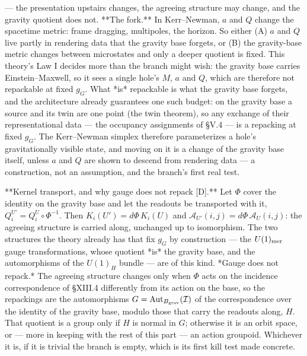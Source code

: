 — the presentation upstairs changes, the agreeing structure may change, and the gravity quotient does not. **The fork.** In Kerr–Newman, $a$ and $Q$ change the spacetime metric: frame dragging, multipoles, the horizon. So either (A) $a$ and $Q$ live partly in rendering data that the gravity base forgets, or (B) the gravity-base metric changes between microstates and only a deeper quotient is fixed. This theory's Law I decides more than the branch might wish: the gravity base carries Einstein–Maxwell, so it sees a single hole's $M$, $a$ and $Q$, which are therefore not repackable at fixed $g_G$. What *is* repackable is what the gravity base forgets, and the architecture already guarantees one such budget: on the gravity base a source and its twin are one point (the twin theorem), so any exchange of their representational data — the occupancy assignments of §V.4 — is a repacking at fixed $g_G$. The Kerr–Newman simplex therefore parameterizes a hole's gravitationally visible state, and moving on it is a change of the gravity base itself, unless $a$ and $Q$ are shown to descend from rendering data — a construction, not an assumption, and the branch's first real test.

**Kernel transport, and why gauge does not repack [D].** Let $\Phi$ cover the identity on the gravity base and let the readouts be transported with it, $Q_i^{U'} = Q_i^U\circ\Phi^{-1}$. Then $K_i(U') = d\Phi\,K_i(U)$ and $\mathcal A_{U'}(i,j) = d\Phi\,\mathcal A_U(i,j)$: the agreeing structure is carried along, unchanged up to isomorphism. The two structures the theory already has that fix $g_G$ by construction — the $U(1)_{\rm mer}$ gauge transformations, whose quotient *is* the gravity base, and the automorphisms of the $U(1)_H$ bundle — are of this kind. *Gauge does not repack.* The agreeing structure changes only when $\Phi$ acts on the incidence correspondence of §XIII.4 differently from its action on the base, so the repackings are the automorphisms $G = \operatorname{Aut}_{B_{\rm grav} }(\mathcal I)$ of the correspondence over the identity of the gravity base, modulo those that carry the readouts along, $H$. That quotient is a group only if $H$ is normal in $G$; otherwise it is an orbit space, or — more in keeping with the rest of this part — an action groupoid. Whichever it is, if it is trivial the branch is empty, which is its first kill test made concrete.

